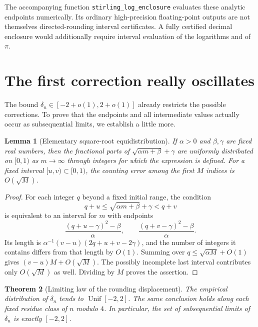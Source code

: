 \documentclass[11pt,letterpaper]{article}
\newtheorem{theorem}{Theorem}[section]
\newtheorem{lemma}[theorem]{Lemma}
\theoremstyle{remark}
\newcommand{\Unif}{\operatorname{Unif}}
\begin{document}
The accompanying function \texttt{stirling\_log\_enclosure} evaluates these
analytic endpoints numerically. Its ordinary high-precision floating-point
outputs are not themselves directed-rounding interval certificates. A fully
certified decimal enclosure would additionally require interval evaluation
of the logarithms and of $\pi$.

\section{The first correction really oscillates}\label{sec:fluctuations}

The bound $\delta_n\in[-2+o(1),2+o(1)]$ already restricts the possible
corrections. To prove that the endpoints and all intermediate values actually
occur as subsequential limits, we establish a little more.

\begin{lemma}[Elementary square-root equidistribution]\label{lem:equid}
If $\alpha>0$ and $\beta,\gamma$ are fixed real numbers, then the fractional
parts of $\sqrt{\alpha m+\beta}+\gamma$ are uniformly distributed on $[0,1)$
as $m\to\infty$ through integers for which the expression is defined.
For a fixed interval $[u,v)\subset[0,1)$, the counting error among the first
$M$ indices is $O(\sqrt M)$.
\end{lemma}

\begin{proof}
For each integer $q$ beyond a fixed initial range, the condition
\[
 q+u\le\sqrt{\alpha m+\beta}+\gamma<q+v
\]
is equivalent to an interval for $m$ with endpoints
\[
 \frac{(q+u-\gamma)^2-\beta}{\alpha},\qquad
 \frac{(q+v-\gamma)^2-\beta}{\alpha}.
\]
Its length is
$\alpha^{-1}(v-u)(2q+u+v-2\gamma)$, and the number of integers it contains
differs from that length by $O(1)$. Summing over
$q\le\sqrt{\alpha M}+O(1)$ gives $(v-u)M+O(\sqrt M)$. The possibly
incomplete last interval contributes only $O(\sqrt M)$ as well. Dividing
by $M$ proves the assertion.
\end{proof}

\begin{theorem}[Limiting law of the rounding displacement]\label{thm:deltauniform}
The empirical distribution of $\delta_n$ tends to $\Unif[-2,2]$.
The same conclusion holds along each fixed residue class of $n$ modulo $4$.
In particular, the set of subsequential limits of $\delta_n$ is exactly
$[-2,2]$.
\end{theorem}
\end{document}
